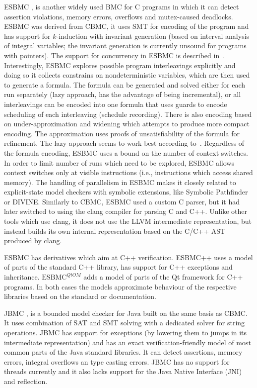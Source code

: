 ESBMC , is another widely used BMC for C
programs in which it can detect assertion violations, memory errors, overflows and mutex-caused deadlocks.
ESBMC was derived from CBMC, it uses SMT for encoding of the program and has
support for $k$-induction with invariant generation (based on interval analysis
of integral variables; the invariant generation is currently unsound for
programs with pointers).
The support for concurrency in ESBMC is described in~.
Interestingly, ESBMC explores possible program interleavings explicitly and
doing so it collects constrains on nondeterministic variables, which are then
used to generate a formula.
The formula can be generated and solved either for each run separately (lazy
approach, has the advantage of being incremental), or all interleavings can be
encoded into one formula that uses guards to encode scheduling of each
interleaving (schedule recording).
There is also encoding based on under-approximation and widening which attempts
to produce more compact encoding.
The approximation uses proofs of unsatisfiability of the formula for refinement.
The lazy approach seems to work best according to~.
Regardless of the formula encoding, ESBMC uses a bound on the number of context
switches.
In order to limit number of runs which need to be explored, ESBMC allows
context switches only at visible instructions (i.e., instructions which access
shared memory).
The handling of parallelism in ESBMC makes it closely related to explicit-state
model checkers with symbolic extensions, like Symbolic Pathfinder or DIVINE.
Similarly to CBMC, ESBMC used a custom C parser, but it had later switched to
using the clang compiler for parsing C and C++.
Unlike other tools which use clang, it does not use the LLVM intermediate
representation, but instead builds its own internal representation based on the
C/C++ AST produced by clang.

ESBMC has derivatives which aim at C++ verification.
ESBMC++  uses a model of parts of the standard C++ library,
has support for C++ exceptions and inheritance.
$\text{ESBMC}^{\textit{Qt}OM}$  adds a model
of parts of the Qt framework for C++ programs.
In both cases the models approximate behaviour of the respective libraries
based on the standard or documentation.

JBMC , is a bounded model checker for
Java built on the same basis as CBMC.
It uses combination of SAT and SMT solving with a dedicated solver for string
operations.
JBMC has support for exceptions (by lowering them to jumps in its intermediate
representation) and has an exact verification-friendly model of most common
parts of the Java standard libraries.
It can detect assertions, memory errors, integral overflows an type casting
errors.
JBMC has no support for threads currently and it also lacks support for the
Java Native Interface (JNI) and reflection.

